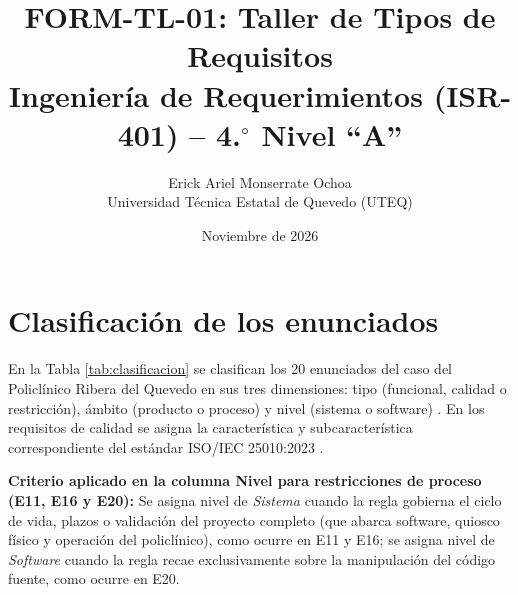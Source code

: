 \documentclass[10pt,a4paper]{article}
\title{\textbf{FORM-TL-01: Taller de Tipos de Requisitos}\\
\large Ingenier\'ia de Requerimientos (ISR-401) -- 4.$^{\circ}$ Nivel ``A''}
\author{Erick Ariel Monserrate Ochoa \\
\small Universidad T\'ecnica Estatal de Quevedo (UTEQ)}
\date{Noviembre de 2026}
\begin{document}
\maketitle

\section{Clasificaci\'on de los enunciados}
En la Tabla \ref{tab:clasificacion} se clasifican los 20 enunciados del caso del Policl\'inico Ribera del Quevedo en sus tres dimensiones: tipo (funcional, calidad o restricci\'on), \'ambito (producto o proceso) y nivel (sistema o software) \cite{pohl2025, iso29148}. En los requisitos de calidad se asigna la caracter\'istica y subcaracter\'istica correspondiente del est\'andar ISO/IEC 25010:2023 \cite{iso25010}.

\textbf{Criterio aplicado en la columna Nivel para restricciones de proceso (E11, E16 y E20):} Se asigna nivel de \textit{Sistema} cuando la regla gobierna el ciclo de vida, plazos o validaci\'on del proyecto completo (que abarca software, quiosco f\'isico y operaci\'on del policl\'inico), como ocurre en E11 y E16; se asigna nivel de \textit{Software} cuando la regla recae exclusivamente sobre la manipulaci\'on del c\'odigo fuente, como ocurre en E20.
\end{document}

